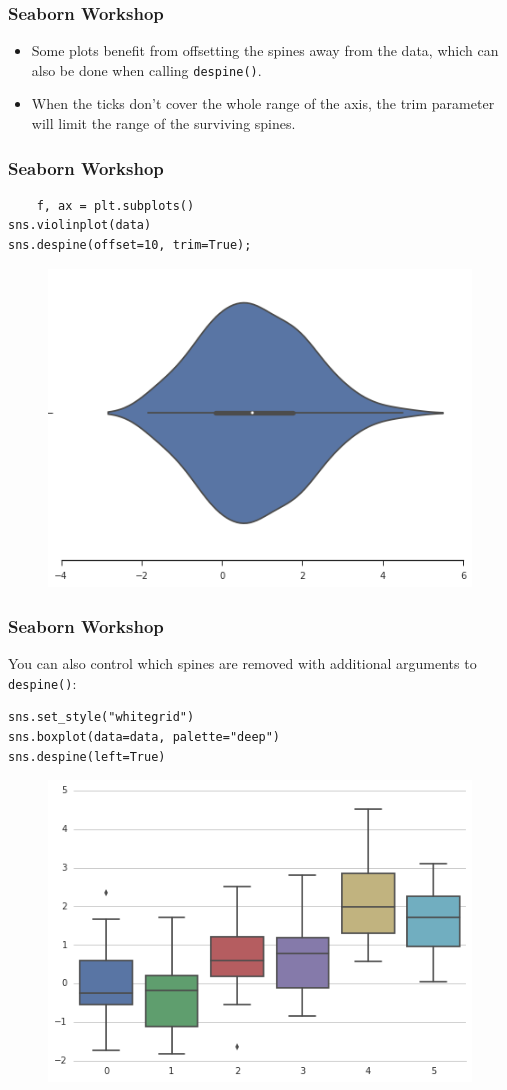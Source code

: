 \documentclass{beamer}
\begin{document}
\begin{frame}[fragile]
	\frametitle{Seaborn Workshop}
	\large 
	
	\begin{itemize}
\item Some plots benefit from offsetting the spines away from the data, which can also be done when calling \texttt{despine()}. 
\item When the ticks don’t cover the whole range of the axis, the trim parameter will limit the range of the surviving spines.

	\end{itemize}
\end{frame}
\begin{frame}[fragile]
	\frametitle{Seaborn Workshop}
	\large
	\begin{verbatim}
	f, ax = plt.subplots()
sns.violinplot(data)
sns.despine(offset=10, trim=True);
\end{verbatim}
\begin{figure}
\centering
\includegraphics[width=0.7\linewidth]{images/aesthetics_23_0}
\end{figure}


\end{frame}
\begin{frame}[fragile]
	\frametitle{Seaborn Workshop}
	\large
You can also control which spines are removed with additional arguments to \texttt{despine()}:
\begin{verbatim}
sns.set_style("whitegrid")
sns.boxplot(data=data, palette="deep")
sns.despine(left=True)
\end{verbatim}

\begin{figure}
\centering
\includegraphics[width=0.6\linewidth]{images/aesthetics_25_0}
\caption{}
\label{fig:aesthetics_25_0}
\end{figure}


\end{frame}
\end{document}
